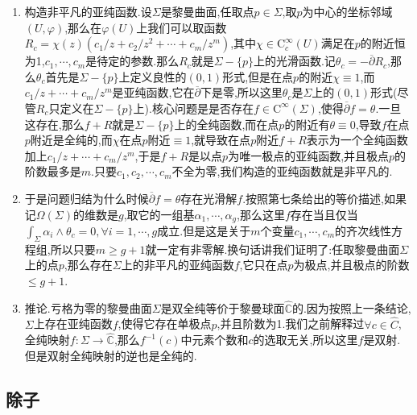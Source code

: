 \begin{enumerate}
\begin{proof}
		充分性.按照Hodge分解,就有$\theta=\overline{\beta}+\overline{\partial}f$,其中$\beta$是全纯的,于是有$0=\int_{\Sigma}\beta\wedge\theta=\int_{\Sigma}\beta\wedge\overline{\beta}+\beta\wedge\overline{\partial}f=\int_{\Sigma}\beta\wedge\overline{\beta}$.但是如果记$\beta=u\mathrm{d}z$,则$\sqrt{-1}\beta\wedge\overline{\beta}=2|u|^2\mathrm{d}x\wedge\mathrm{d}y=\rho^{-1}|u|^2\omega$,所以它的积分是零只能得到$u=0$,也即$\beta=0$,于是$\theta=\overline{\partial}f$.
	\end{proof}
    \item 构造非平凡的亚纯函数.设$\Sigma$是黎曼曲面,任取点$p\in\Sigma$,取$p$为中心的坐标邻域$(U,\varphi)$,那么在$\varphi(U)$上我们可以取函数$R_c=\chi(z)\left(c_1/z+c_2/z^2+\cdots+c_m/z^m\right)$,其中$\chi\in\mathrm{C}_c^{\infty}(U)$满足在$p$的附近恒为1,$c_1,\cdots,c_m$是待定的参数.那么$R_c$就是$\Sigma-\{p\}$上的光滑函数.记$\theta_c=-\overline{\partial}R_c$,那么$\theta_c$首先是$\Sigma-\{p\}$上定义良性的$(0,1)$形式,但是在点$p$的附近$\chi\equiv1$,而$c_1/z+\cdots+c_m/z^m$是亚纯函数,它在$\overline{\partial}$下是零,所以这里$\theta_c$是$\Sigma$上的$(0,1)$形式(尽管$R_c$只定义在$\Sigma-\{p\}$上).核心问题是是否存在$f\in\mathrm{C}^{\infty}(\Sigma)$,使得$\overline{\partial}f=\theta$.一旦这存在,那么$f+R$就是$\Sigma-\{p\}$上的全纯函数,而在点$p$的附近有$\theta\equiv0$,导致$f$在点$p$附近是全纯的,而$\chi$在点$p$附近$\equiv1$,就导致在点$p$附近$f+R$表示为一个全纯函数加上$c_1/z+\cdots+c_m/z^m$,于是$f+R$是以点$p$为唯一极点的亚纯函数,并且极点$p$的阶数最多是$m$.只要$c_1,c_2,\cdots,c_m$不全为零,我们构造的亚纯函数就是非平凡的.
    \item 于是问题归结为什么时候$\overline{\partial}f=\theta$存在光滑解$f$.按照第七条给出的等价描述,如果记$\Omega(\Sigma)$的维数是$g$,取它的一组基$\alpha_1,\cdots,\alpha_g$,那么这里$f$存在当且仅当$\int_{\Sigma}\alpha_i\wedge\theta_c=0,\forall i=1,\cdots,g$成立.但是这是关于$m$个变量$c_1,\cdots,c_m$的齐次线性方程组,所以只要$m\ge g+1$就一定有非零解.换句话讲我们证明了:任取黎曼曲面$\Sigma$上的点$p$,那么存在$\Sigma$上的非平凡的亚纯函数$f$,它只在点$p$为极点,并且极点的阶数$\le g+1$.
    \item 推论.亏格为零的黎曼曲面$\Sigma$是双全纯等价于黎曼球面$\widehat{\mathbb{C}}$的.因为按照上一条结论,$\Sigma$上存在亚纯函数$f$,使得它存在单极点$p$,并且阶数为1.我们之前解释过$\forall c\in\widehat{C}$,全纯映射$f:\Sigma\to\widehat{\mathbb{C}}$,那么$f^{-1}(c)$中元素个数和$c$的选取无关,所以这里$f$是双射.但是双射全纯映射的逆也是全纯的.
\end{enumerate}
\subsection{除子}

